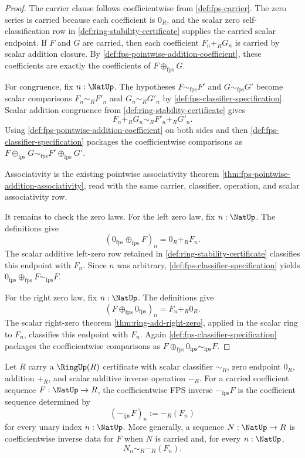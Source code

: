 \begin{proof}
The carrier clause follows coefficientwise from \autoref{def:fps-carrier}. The zero series is carried because each coefficient is $0_R$, and the scalar zero self-classification row in \autoref{def:ring-stability-certificate} supplies the carried scalar endpoint. If $F$ and $G$ are carried, then each coefficient $F_n+_R G_n$ is carried by scalar addition closure. By \autoref{def:fps-pointwise-addition-coefficient}, these coefficients are exactly the coefficients of $F\oplus_{\mathrm{fps}}G$.

For congruence, fix $n:\NatUp$. The hypotheses $F\sim_{\mathrm{fps}}F'$ and $G\sim_{\mathrm{fps}}G'$ become scalar comparisons $F_n\sim_R F'_n$ and $G_n\sim_R G'_n$ by \autoref{def:fps-classifier-specification}. Scalar addition congruence from \autoref{def:ring-stability-certificate} gives
$$
F_n+_R G_n\sim_R F'_n+_R G'_n.
$$
Using \autoref{def:fps-pointwise-addition-coefficient} on both sides and then \autoref{def:fps-classifier-specification} packages the coefficientwise comparisons as $F\oplus_{\mathrm{fps}}G\sim_{\mathrm{fps}}F'\oplus_{\mathrm{fps}}G'$.

Associativity is the existing pointwise associativity theorem \autoref{thm:fps-pointwise-addition-associativity}, read with the same carrier, classifier, operation, and scalar associativity row.

It remains to check the zero laws. For the left zero law, fix $n:\NatUp$. The definitions give
$$
(0_{\mathrm{fps}}\oplus_{\mathrm{fps}}F)_n=0_R+_R F_n.
$$
The scalar additive left-zero row retained in \autoref{def:ring-stability-certificate} classifies this endpoint with $F_n$. Since $n$ was arbitrary, \autoref{def:fps-classifier-specification} yields $0_{\mathrm{fps}}\oplus_{\mathrm{fps}}F\sim_{\mathrm{fps}}F$.

For the right zero law, fix $n:\NatUp$. The definitions give
$$
(F\oplus_{\mathrm{fps}}0_{\mathrm{fps}})_n=F_n+_R0_R.
$$
The scalar right-zero theorem \autoref{thm:ring-add-right-zero}, applied in the scalar ring to $F_n$, classifies this endpoint with $F_n$. Again \autoref{def:fps-classifier-specification} packages the coefficientwise comparisons as $F\oplus_{\mathrm{fps}}0_{\mathrm{fps}}\sim_{\mathrm{fps}}F$.
\end{proof}

\begin{definition}
\label{def:fps-coefficientwise-additive-inverse}
Let $R$ carry a $\RingUp(R)$ certificate with scalar classifier $\sim_R$, zero endpoint $0_R$, addition $+_R$, and scalar additive inverse operation $-_R$. For a carried coefficient sequence $F:\NatUp\to R$, the coefficientwise FPS inverse $-_{\mathrm{fps}}F$ is the coefficient sequence determined by
$$
(-_{\mathrm{fps}}F)_n:= -_R(F_n)
$$
for every unary index $n:\NatUp$. More generally, a sequence $N:\NatUp\to R$ is coefficientwise inverse data for $F$ when $N$ is carried and, for every $n:\NatUp$,
$$
N_n\sim_R -_R(F_n).
$$
\end{definition}

